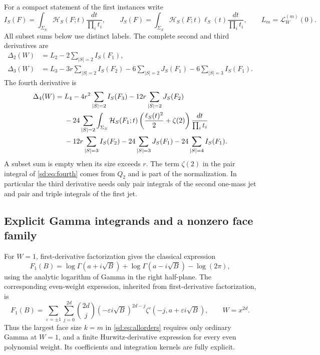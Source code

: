\documentclass[11pt,a4paper]{article}
\numberwithin{equation}{section}
\theoremstyle{definition}
\theoremstyle{remark}
\begin{document}
For a compact statement of the first instances write
\[
 I_S(F)=\int_{\Sigma_S}\mathcal H_S(F;t)
                       \frac{dt}{\prod_i t_i},\qquad
 J_S(F)=\int_{\Sigma_S}\mathcal H_S(F;t)\ell_S(t)
                       \frac{dt}{\prod_i t_i},
 \qquad L_m=\mathcal L_W^{(m)}(0).
\]
All subset sums below use distinct labels.  The complete second and
third derivatives are
\begin{align}
 \Delta_2(W)&=L_2-2\sum_{|S|=2}I_S(F_1),
                    \label{sd:eq:second}\\
 \Delta_3(W)&=L_3-3r\sum_{|S|=2}I_S(F_2)
                  -6\sum_{|S|=2}J_S(F_1)
                  -6\sum_{|S|=3}I_S(F_1).
                    \label{sd:eq:third}
\end{align}
The fourth derivative is
\begin{align}\label{sd:eq:fourth}
 \Delta_4(W)={}&L_4-4r^2\sum_{|S|=2}I_S(F_3)
                    -12r\sum_{|S|=2}J_S(F_2)\notag\\
 &-24\sum_{|S|=2}\int_{\Sigma_S}\mathcal H_S(F_1;t)
             \left(\frac{\ell_S(t)^2}{2}+\zeta(2)\right)
                                  \frac{dt}{\prod_i t_i}\notag\\
 &-12r\sum_{|S|=3}I_S(F_2)-24\sum_{|S|=3}J_S(F_1)
                              -24\sum_{|S|=4}I_S(F_1).
\end{align}
A subset sum is empty when its size exceeds $r$.  The term $\zeta(2)$
in the pair integral of \eqref{sd:eq:fourth} comes from $Q_2$ and is
part of the normalization.  In particular the third derivative needs
only pair integrals of the second one-mass jet and pair and triple
integrals of the first jet.

\subsection{Explicit Gamma integrands and a nonzero face family}
\label{sd:subsec:gamma}

For $W=1$, first-derivative factorization gives the classical expression
\begin{equation}\label{sd:eq:gamma}
 F_1(B)=\log\Gamma(a+i\sqrt B)+\log\Gamma(a-i\sqrt B)
                                      -\log(2\pi),
\end{equation}
using the analytic logarithm of Gamma in the right half-plane.
The corresponding even-weight expression, inherited from
first-derivative factorization, is
\begin{equation}\label{sd:eq:evenhurwitz}
 F_1(B)=\sum_{\varepsilon=\pm1}\sum_{j=0}^{2d}
   \binom{2d}{j}(-\varepsilon i\sqrt B)^{2d-j}
               \zeta'(-j,a+\varepsilon i\sqrt B),
             \qquad W=x^{2d}.
\end{equation}
Thus the largest face size $k=m$ in \eqref{sd:eq:allorders} requires
only ordinary Gamma at $W=1$, and a finite Hurwitz-derivative expression
for every even polynomial weight.  Its coefficients and integration
kernels are fully explicit.
\end{document}
